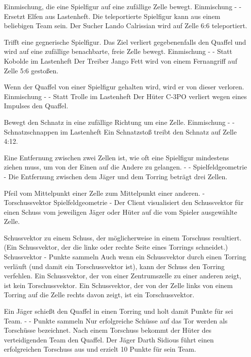 {Einmischung, die eine Spielfigur auf eine zufällige Zelle bewegt.}
{Einmischung}
{-}
{-}
{Ersetzt \glqq{}Elfen\grqq{}  aus Lastenheft. Die teleportierte Spielfigur kann aus einem beliebigen Team sein.}
{Der Sucher \glqq{}Lando Calrissian\grqq{} wird auf Zelle 6:6 teleportiert.}

{Trifft eine gegnerische Spielfigur. Das Ziel verliert gegebenenfalls den Quaffel und wird auf eine zufällige benachbarte, freie Zelle bewegt.}
{Einmischung}
{-}
{-}
{Statt \glqq{}Kobolde\grqq{}  im Lastenheft}
{Der Treiber \glqq{}Jango Fett\grqq{} wird von einem Fernangriff auf Zelle 5:6 gestoßen.}

{Wenn der Quaffel von einer Spielfigur gehalten wird, wird er von dieser verloren.}
{Einmischung}
{-}
{-}
{Statt \glqq{}Trolle\grqq{}  im Lastenheft}
{Der Hüter \glqq{}C-3PO\grqq{} verliert wegen eines Impulses den Quaffel.}

{Bewegt den Schnatz in eine zufällige Richtung um eine Zelle.}
{Einmischung}
{-}
{-}
{\glqq{}Schnatzschnappen\grqq{}  im Lastenheft}
{Ein Schnatzstoß treibt den Schnatz auf Zelle 4:12.}

{Eine Entfernung zwischen zwei Zellen ist, wie oft eine Spielfigur mindestens ziehen muss, um von der Einen auf die Andere zu  gelangen.}
{-}
{-}
{Spielfeldgeometrie}
{-}
{Die Entfernung zwischen dem Jäger und dem Torring beträgt drei Zellen.}

{Pfeil vom Mittelpunkt einer Zelle zum Mittelpunkt einer anderen.}
{-}
{Torschussvektor}
{Spielfeldgeometrie}
{-}
{Der Client visualisiert den Schussvektor für einen Schuss vom jeweiligen Jäger oder Hüter auf die vom Spieler ausgewählte Zelle.}

{Schussvektor zu einem Schuss, der möglicherweise in einem Torschuss resultiert. (Ein Schussvektor, der die linke oder rechte Seite eines Torrings schneidet.)}
{Schussvektor}
{-}
{Punkte sammeln}
{Auch wenn ein Schussvektor durch einen Torring verläuft (und damit ein Torschussvektor ist), kann der Schuss den Torring verfehlen.}
{Ein Schussvektor, der von einer Zentrumszelle zu einer anderen zeigt, ist kein Torschussvektor. Ein Schussvektor, der von der Zelle links von einem Torring auf die Zelle rechts davon zeigt, ist ein Torschussvektor.}

{Ein Jäger schießt den Quaffel in einen Torring und holt damit Punkte für sei Team.}
{-}
{-}
{Punkte sammeln}
{Nur erfolgreiche Schüsse auf das Tor werden als Torschüsse bezeichnet. Nach einem Torschuss bekommt der Hüter des verteidigenden Team den Quaffel.}
{Der Jäger \glqq{}Darth Sidious\grqq{} führt einen erfolgreichen Torschuss aus und erzielt 10 Punkte für sein Team.}

